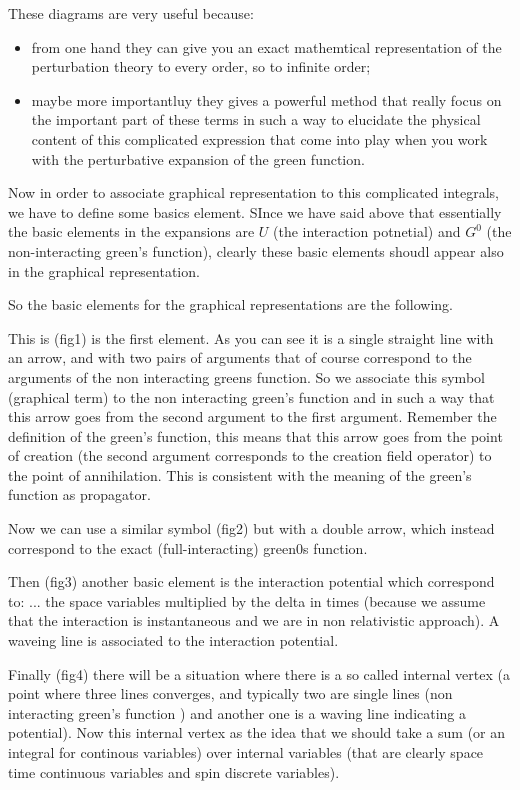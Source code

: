 \documentclass[../main/main.tex]{subfiles}
\begin{document}
These diagrams are very useful because:
\begin{itemize}
\item from one hand they can give you an exact mathemtical representation of the perturbation theory to every order, so to infinite order;
\item maybe more importantluy they gives a powerful method that really focus on the important part of these terms in such a way to elucidate the physical content of this complicated expression that come into play when you work with the perturbative expansion of the green function.
\end{itemize}

Now in order to associate graphical representation to this complicated integrals, we have to define some basics element. SInce we have said above that essentially the basic elements in the expansions are \( U \) (the interaction potnetial) and \( G^0\) (the non-interacting green's function), clearly these basic elements shoudl appear also in the graphical representation.

So the basic elements for the graphical representations are the following.

This is (fig1) is the first element. As you can see it is a single straight line with an arrow, and with two pairs of arguments that of course correspond to the arguments of the non interacting greens function.
So we associate this symbol (graphical term) to the non interacting green's function and in such a way that this arrow goes from the second argument to the first argument. Remember the definition of the green's function, this means that this arrow goes from the point of creation (the second argument corresponds to the creation field operator) to the point of annihilation. This is consistent with the meaning of the green's function as propagator.

Now we can use a similar symbol (fig2) but with a double arrow, which instead correspond to the exact (full-interacting) green0s function.

Then (fig3) another basic element is the interaction potential which correspond to:
...
the space variables multiplied by the delta in times (because we assume that the interaction is instantaneous and we are in non relativistic approach). A waveing line is associated to the interaction potential.


Finally (fig4) there will be a situation where there is a so called internal vertex (a point where three lines converges, and typically two are single lines (non interacting green's function ) and another one is a waving line indicating a potential). Now this internal vertex as the idea that we should take a sum (or an integral for continous variables) over internal variables (that are clearly space time continuous variables and spin discrete variables).
\end{document}
